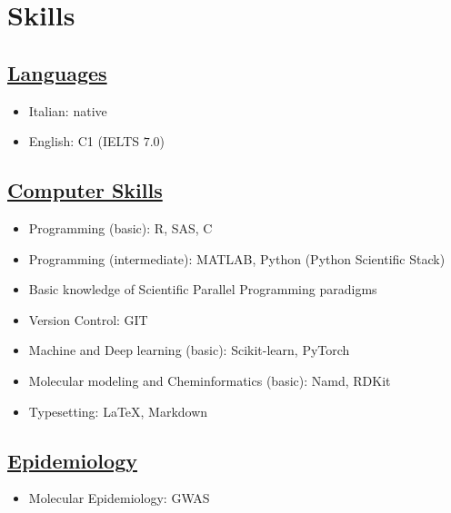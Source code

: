 \section{Skills}

\subsection{\underline{Languages}}
\begin{itemize}
  \item Italian: native
  \item English: C1 (IELTS $7.0$)
\end{itemize}


\subsection{\underline{Computer Skills}}
\begin{itemize}
  \item Programming (basic): R, SAS, C
  \item Programming (intermediate): MATLAB, Python (Python Scientific Stack)
  \item Basic knowledge of Scientific Parallel Programming paradigms
  \item Version Control: GIT
  \item Machine and Deep learning (basic): Scikit-learn, PyTorch
  \item Molecular modeling and Cheminformatics (basic): Namd, RDKit
  \item Typesetting: \LaTeX, Markdown
\end{itemize}


\subsection{\underline{Epidemiology}}
\begin{itemize}
	\item Molecular Epidemiology: GWAS
\end{itemize}
